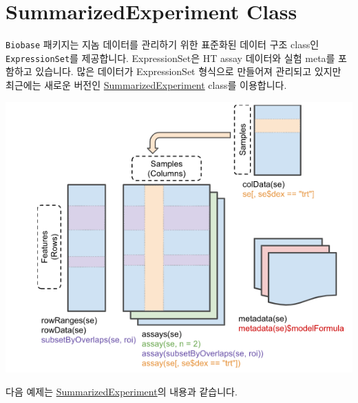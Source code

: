 \documentclass[
]{book}
\begin{document}
\hypertarget{summarizedexperiment-class}{%
\section{SummarizedExperiment Class}\label{summarizedexperiment-class}}

\texttt{Biobase} 패키지는 지놈 데이터를 관리하기 위한 표준화된 데이터 구조 class인 \texttt{ExpressionSet}를 제공합니다. ExpressionSet은 HT assay 데이터와 실험 meta를 포함하고 있습니다. 많은 데이터가 ExpressionSet 형식으로 만들어져 관리되고 있지만 최근에는 새로운 버전인 \href{https://bioconductor.org/packages/release/bioc/html/SummarizedExperiment.html}{SummarizedExperiment} class를 이용합니다.

\includegraphics{images/summarizedexp.PNG}

다음 예제는 \href{https://bioconductor.org/packages/release/bioc/vignettes/SummarizedExperiment/inst/doc/SummarizedExperiment.html}{SummarizedExperiment}의 내용과 같습니다.
\end{document}
